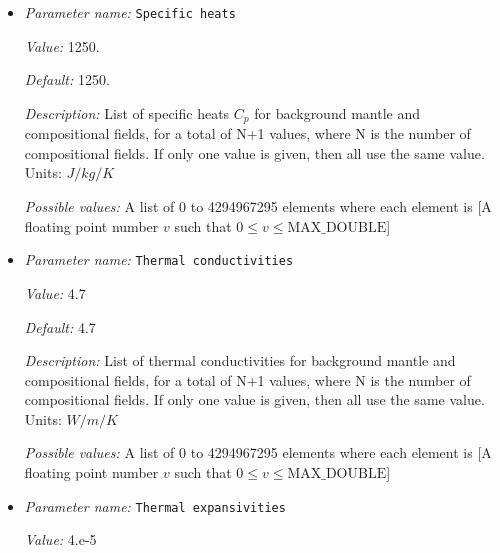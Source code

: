\begin{itemize}
{\it Value:} 293


{\it Default:} 293


{\it Description:} The reference temperature $T_0$. Units: $K$.


{\it Possible values:} A floating point number $v$ such that $0 \leq v \leq \text{MAX\_DOUBLE}$
\item {\it Parameter name:} {\tt Specific heats}
\label{parameters:Material model/Viscoelastic/Specific heats}


{\it Value:} 1250.


{\it Default:} 1250.


{\it Description:} List of specific heats $C_p$ for background mantle and compositional fields, for a total of N+1 values, where N is the number of compositional fields. If only one value is given, then all use the same value. Units: $J /kg /K$


{\it Possible values:} A list of 0 to 4294967295 elements where each element is [A floating point number $v$ such that $0 \leq v \leq \text{MAX\_DOUBLE}$]
\item {\it Parameter name:} {\tt Thermal conductivities}
\label{parameters:Material model/Viscoelastic/Thermal conductivities}


{\it Value:} 4.7


{\it Default:} 4.7


{\it Description:} List of thermal conductivities for background mantle and compositional fields, for a total of N+1 values, where N is the number of compositional fields. If only one value is given, then all use the same value. Units: $W/m/K$ 


{\it Possible values:} A list of 0 to 4294967295 elements where each element is [A floating point number $v$ such that $0 \leq v \leq \text{MAX\_DOUBLE}$]
\item {\it Parameter name:} {\tt Thermal expansivities}
\label{parameters:Material model/Viscoelastic/Thermal expansivities}


{\it Value:} 4.e-5



\end{itemize}
